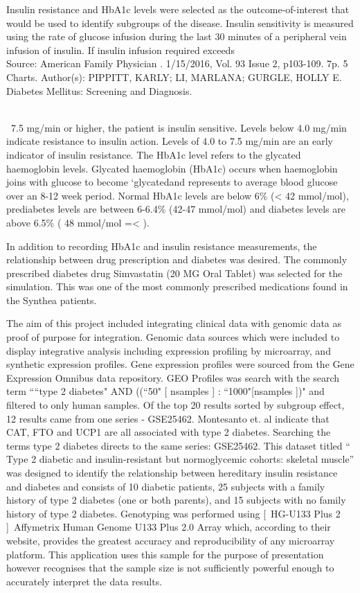\documentclass{bioinfo}
\begin{document}
\begin{methods}
Insulin resistance and HbA1c levels were selected as the outcome-of-interest that would be used to identify subgroups of the disease. Insulin sensitivity is measured using the rate of glucose infusion during the last 30 minutes of a peripheral vein infusion of insulin. If insulin infusion required exceeds 
\\
Source: American Family Physician . 1/15/2016, Vol. 93 Issue 2, p103-109. 7p. 5 Charts.
Author(s): PIPPITT, KARLY; LI, MARLANA; GURGLE, HOLLY E.
Diabetes Mellitus: Screening and Diagnosis.

\\\
7.5 mg/min or higher, the patient is insulin sensitive. Levels below 4.0 mg/min indicate resistance to insulin action. Levels of 4.0 to 7.5 mg/min are an early indicator of insulin resistance. The HbA1c level refers to the glycated haemoglobin levels. Glycated haemoglobin (HbA1c) occurs when haemoglobin joins with glucose to become ‘glycated\textquotesingle and represents to average blood glucose over an 8-12 week period. Normal HbA1c levels are below 6\% ({<} 42 mmol/mol), prediabetes levels are between 6-6.4\% (42-47 mmol/mol) and diabetes levels are above 6.5\% ( 48 mmol/mol {=<} ). 

In addition to recording HbA1c and insulin resistance measurements, the relationship between drug prescription and diabetes was desired. The commonly prescribed diabetes drug Simvastatin (20 MG Oral Tablet) was selected for the simulation. This was one of the most commonly prescribed medications found in the Synthea patients.

The aim of this project included integrating clinical data with genomic data as proof of purpose for integration. Genomic data sources which were included to display integrative analysis including expression profiling by microarray, and synthetic expression profiles. Gene expression profiles were sourced from the Gene Expression Omnibus data repository. GEO Profiles was search with the search term ````type 2 diabetes" AND ((``50" {[ n\textunderscore samples ]} : ``1000"{[}n\textunderscorec samples {]})"  and filtered to only human samples. Of the top 20 results sorted by subgroup effect, 12 results came from one series - GSE25462. Montesanto et. al indicate that CAT, FTO and UCP1 are all associated with type 2 diabetes. Searching the terms type 2 diabetes directs to the same series: GSE25462. This dataset titled “ Type 2 diabetic and insulin-resistant but normoglycemic cohorts: skeletal muscle” was designed to identify the relationship between hereditary insulin resistance and diabetes and consists of 10 diabetic patients, 25 subjects with a family history of type 2 diabetes (one or both parents), and 15 subjects with no family history of type 2 diabetes. Genotyping was performed using [\ HG-U133 Plus 2 ]\ Affymetrix Human Genome U133 Plus 2.0 Array which, according to their website, provides the greatest accuracy and reproducibility of any microarray platform. This application uses this sample for the purpose of presentation however recognises that the sample size is not sufficiently powerful enough to accurately interpret the data results. 



\end{methods}
\end{document}
